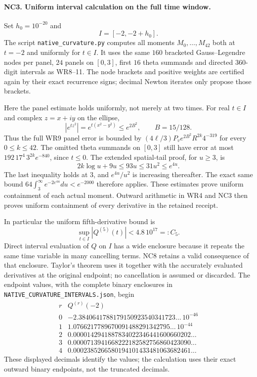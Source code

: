 \paragraph{NC3. Uniform interval calculation on the full time window.}
Set $h_0=10^{-20}$ and
\[
 I=[-2,-2+h_0].\tag{NC5}
\]
The script \texttt{native\_curvature.py} computes all moments
$M_0,\ldots,M_{42}$ both at $t=-2$ and uniformly for $t\in I$.
It uses the same $160$ bracketed Gauss--Legendre nodes per panel,
$24$ panels on $[0,3]$, first $16$ theta summands and directed
$360$-digit intervals as WR8--11. The node brackets and positive
weights are certified again by their exact recurrence signs;
decimal Newton iterates only propose those brackets.

Here the panel estimate holds uniformly, not merely at two times.
For real $t\in I$ and complex $z=x+iy$ on the ellipse,
\[
 |e^{tz^2}|=e^{t(x^2-y^2)}\le e^{2B^2},\qquad B=15/128.
 \tag{NC6}
\]
Thus the full WR9 panel error is bounded by
$(4\ell/3)P_v e^{2B^2}R^{2k}4^{-319}$ for every $0\le k\le42$.
The omitted theta summands on $[0,3]$ still have error at most
$192\,17^4\,3^{2k}e^{-840}$, since $t\le0$.
The extended spatial-tail proof, for $u\ge3$, is
\[
 2k\log u+9u\le93u\le31u^2\le e^{4u}.
 \tag{NC7}
\]
The last inequality holds at $3$, and $e^{4u}/u^2$ is increasing
thereafter. The exact same bound
$64\int_3^\infty e^{-2e^{4u}}du<e^{-2000}$ therefore applies.
These estimates prove uniform containment of each actual moment.
Outward arithmetic in WR4 and NC3 then proves uniform containment
of every derivative in the retained receipt.

In particular the uniform fifth-derivative bound is
\[
 \sup_{t\in I}|Q^{(5)}(t)|<4.8\,10^{17}=:C_5.
 \tag{NC8}
\]
Direct interval evaluation of $Q$ on $I$ has a wide enclosure
because it repeats the same time variable in many cancelling terms.
NC8 retains a valid consequence of that enclosure. Taylor's theorem
uses it together with the accurately evaluated derivatives at the
original endpoint; no cancellation is assumed or discarded.
The endpoint values, with the complete binary enclosures in
\texttt{NATIVE\_CURVATURE\_INTERVALS.json}, begin
\[
\begin{array}{c|r}
r&Q^{(r)}(-2)\\\hline
0&-2.3840641788179150923540341723\ldots\,10^{-46}\\
1& 1.0766217789670091488291342795\ldots\,10^{-44}\\
2& 0.0000142941887834022346441600660202\ldots\\
3& 0.0000713941668222182582756860423090\ldots\\
4& 0.0002385266580194101433481063682461\ldots
\end{array}\tag{NC9}
\]
These displayed decimals identify the values; the calculation uses
their exact outward binary endpoints, not the truncated decimals.

